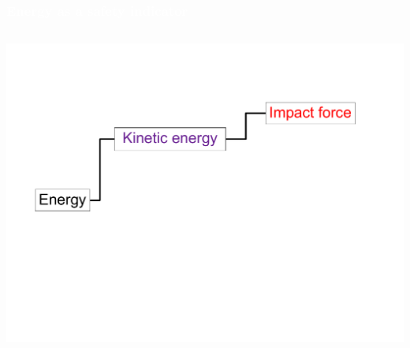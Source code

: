 \begin{frame}
\frametitle{{\textcolor{white}{Energy as a safety indicator}}}

\begin{columns}
\column{.95\paperwidth}

\begin{center}                
\includegraphics[width=1\textwidth ]{figures/fin03.pdf}
\end{center}       

\end{columns}

\end{frame}







